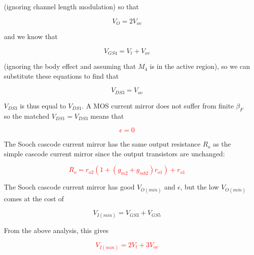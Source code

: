 (ignoring channel length modulation) so that

\begin{equation}
V_{O} = 2V_{ov}
\end{equation}

and we know that

\begin{equation}
V_{GS4} = V_{t} + V_{ov}
\end{equation}

(ignoring the body effect and assuming that $M_4$ is in the active region), so we can substitute these equations to find that

\begin{equation}
V_{DS3} = V_{ov}
\end{equation}

$V_{DS3}$ is thus equal to $V_{DS1}$. \autocite[270-273]{analysis-design-analog-ics}
A MOS current mirror does not suffer from finite $\beta_{F}$ so the matched $V_{DS1} = V_{DS3}$ means that

\textcolor{red}{
\begin{equation}
\epsilon = 0
\end{equation}
}

The Sooch cascode current mirror has the same output resistance $R_{o}$ as the simple cascode current mirror since the output transistors are unchanged:

\textcolor{red}{
\begin{equation}
R_{o} = r_{o2}(1+(g_{m2}+g_{mb2})r_{o1})+ r_{o1}
\end{equation}
}

The Sooch cascode current mirror has good $V_{O(min)}$ and $\epsilon$, but the low $V_{O(min)}$ comes at the cost of

\begin{equation}
V_{I(min)} = V_{GS3} + V_{GS5}
\end{equation}

From the above analysis, this gives

\textcolor{red}{
\begin{equation}
V_{I(min)} = 2V_{t} + 3V_{ov}
\end{equation}
}

